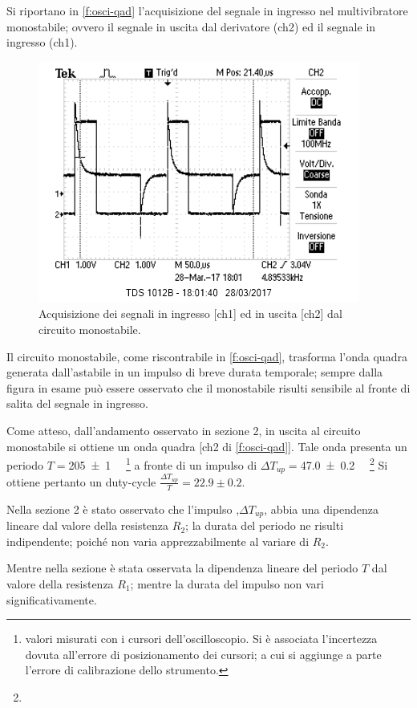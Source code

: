 	Si riportano in \figurename{ \ref{f:osci-qad}} l'acquisizione del segnale in 
	ingresso nel multivibratore monostabile; ovvero il segnale in uscita dal derivatore (ch2) ed il segnale in ingresso (ch1).
	\begin{figure}[htb]
		\includegraphics[scale=1.0]{../Figs-Tabs/deth_generator.png}
		\caption{Acquisizione dei segnali in ingresso [ch1] ed in uscita [ch2] dal circuito monostabile.}
	\end{figure}\label{f:osci-qad}
	Il circuito monostabile, come riscontrabile in \figurename{ \ref{f:osci-qad}},
	trasforma l'onda quadra generata dall'astabile in un impulso di breve durata temporale; sempre dalla figura in esame può essere osservato che il monostabile risulti sensibile al fronte di salita del segnale in ingresso.
	
	Come atteso, dall'andamento osservato in sezione 2, in uscita al circuito monostabile si ottiene un onda quadra [ch2 di \figurename{ \ref{f:osci-qad}}].
	Tale onda presenta un periodo 
	$T=$\SI{205 \pm 1 }{\mu \sec}
	\footnote{valori misurati con i cursori dell'oscilloscopio. Si è associata l'incertezza dovuta all'errore di posizionamento dei cursori; a cui si aggiunge a parte l'errore di calibrazione dello strumento.}
	a fronte di un impulso di $\Delta T_{up} =$\SI{47.0 \pm 0.2 }{\mu \sec}
	\footnote[1]{}
	Si ottiene pertanto un duty-cycle $\frac{\Delta T_{up}}{T}= 22.9 \pm 0.2$\textdiscount.
	
	Nella sezione 2 è stato osservato che l'impulso ,$\Delta T_{up}$, 
	abbia una dipendenza lineare dal valore della resistenza $R_{2}$;
	la durata del periodo ne risulti indipendente; poiché non varia apprezzabilmente al variare di $R_{2}$.
	
	Mentre nella sezione  è stata osservata la dipendenza lineare 
	del periodo $T$ dal valore della resistenza $R_{1}$;
	mentre la durata del impulso non vari significativamente.
	
